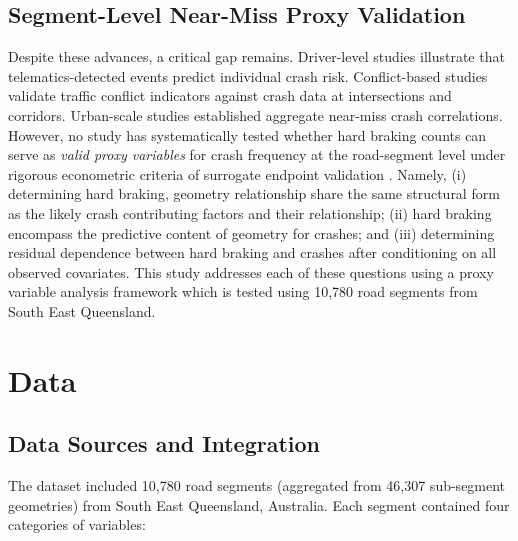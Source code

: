 \documentclass[letterpaper,8pt]{extarticle}  %
\begin{document}
\begin{doublespacing}
\begin{linenumbers}
\subsection{Segment-Level Near-Miss Proxy Validation}

Despite these advances, a critical gap remains. Driver-level studies
\citep{Guo2010NearStudies,Arumi2024CanEvents,Ayuso2019TelematicsWomens} illustrate that telematics-detected events predict individual crash risk. Conflict-based studies
\citep{Zheng2019ValidatingIndicators, Yang2021Copula-basedMargins} validate traffic conflict indicators against crash data at intersections and corridors. Urban-scale studies
\citep{Xu2024EstimatingStudy} established aggregate near-miss crash correlations. However, no
study has systematically tested whether hard braking counts can serve as
\emph{valid proxy variables} for crash frequency at the road-segment level
under rigorous econometric criteria of surrogate endpoint validation
\citep{Prentice1989SurrogateCriteria}. Namely, (i) determining hard braking, geometry relationship
share the same structural form as the likely crash contributing factors and their relationship;  (ii)
hard braking encompass the predictive content of geometry for crashes; and (iii)
determining residual dependence between hard braking and crashes after
conditioning on all observed covariates. This study addresses each
of these questions using a proxy variable analysis framework
which is tested using 10,780 road segments from South East Queensland.

\section{Data}\label{sec:data}

\subsection{Data Sources and Integration}

The dataset included 10,780 road segments (aggregated from 46,307 sub-segment geometries) from South East Queensland, Australia. Each segment contained four categories of variables:


\end{linenumbers}
\end{doublespacing}
\end{document}
